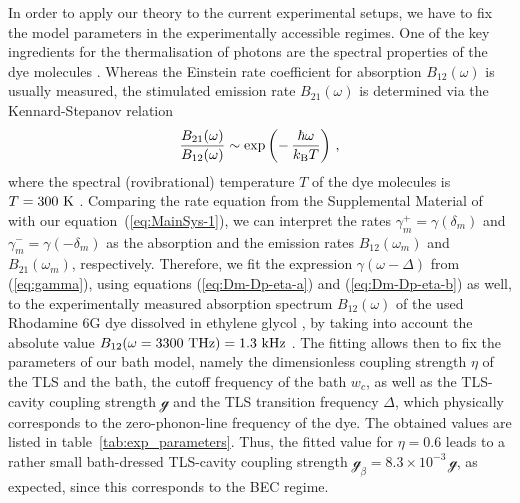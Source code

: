 \documentclass[12pt, a4paper]{iopart}
\begin{document}
In order to apply our theory to the current experimental setups, we have to fix the model parameters in the experimentally accessible regimes. One of the key ingredients for the thermalisation of photons are the spectral properties of the dye molecules \cite{PhotonBEC-Thermalization_kinetics-Weitz,Carusotto-Pseudo-thermalization}. Whereas the Einstein rate coefficient for absorption $B_{12}(\omega)$ is usually measured, the stimulated emission rate $B_{21}(\omega)$ is determined via the Kennard-Stepanov relation \cite{Kennard1,Kennard2,Stepanov}
%
\begin{equation}
\label{eq:Kennard-Stepanov}
\frac{B_{21}(\omega)}{B_{12}(\omega)} \sim \exp\left(-\,\frac{\hbar \omega}{k_{\rm B} T} \right)  \, ,
\end{equation}
%
where the spectral (rovibrational) temperature $T$ of the dye molecules is $T = 300~{\rm K}$ \cite{PhotonBEC-Thermalization_kinetics-Weitz}. Comparing the rate equation from the Supplemental Material of \cite{PhotonBEC-Thermalization_kinetics-Weitz} with our equation~(\ref{eq:MainSys-1}), we can interpret the rates $\gamma^+_m=\gamma(\delta_m)$ and $\gamma^-_m=\gamma(-\delta_m)$ as the absorption and the emission rates $B_{12}(\omega_m)$ and $B_{21}(\omega_m)$, respectively. Therefore, we fit the  expression $\gamma(\omega-\Delta)$ from (\ref{eq:gamma}), using equations (\ref{eq:Dm-Dp-eta-a}) and (\ref{eq:Dm-Dp-eta-b}) as well, to the experimentally measured absorption spectrum $B_{12}(\omega)$ of the used Rhodamine 6G dye dissolved in ethylene glycol \cite{Private-Julian_Schmitt}, by taking into account the absolute value $B_{12}(\omega = 3300~{\rm THz}) = 1.3~{\rm kHz}$ \cite{PhotonBEC-Thermalization_kinetics-Weitz}. The fitting allows then to fix the parameters of our bath model, namely the dimensionless coupling strength $\eta$ of the TLS and the bath, the cutoff frequency of the bath $w_c$, as well as the TLS-cavity coupling strength $\mathcal{g}$ and the TLS transition frequency $\Delta$, which physically corresponds to the zero-phonon-line frequency of the dye. The obtained values are listed in table~\ref{tab:exp_parameters}. Thus, the fitted value for $\eta = 0.6$ leads to a rather small bath-dressed TLS-cavity coupling strength $\mathcal{g}_\beta = 8.3\times 10^{-3}\,\mathcal{g}$, as expected, since this corresponds to the BEC regime.
\end{document}
